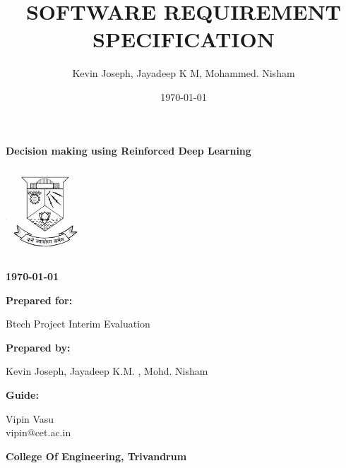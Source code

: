 \documentclass[twoside,letterpaper]{article}
\title{SOFTWARE REQUIREMENT SPECIFICATION}
\author{Kevin Joseph, Jayadeep K M, Mohammed. Nisham}
\date{\today}
\begin{document}


\bigskip

{\centering{}\bfseries\color{black}
Decision making using Reinforced Deep Learning
\par}


\bigskip

\centering
\includegraphics[width=3cm]{images/logo.jpg}

\bigskip

{\centering{}\bfseries\color{black}
\today
\par}


\bigskip


\bigskip

{\centering{}\bfseries\color{black}
Prepared for:
\par}

{\centering{}\color{black}
Btech Project Interim Evaluation
\par}


\bigskip


\bigskip

{\centering{}\bfseries\color{black}
Prepared by:
\par}

{\centering{}\color{black}
Kevin Joseph, Jayadeep K.M. , Mohd. Nisham
\par}
\bigskip
{\centering{}\bfseries\color{black}
Guide:
\par}

{\centering{}\color{black}
Vipin Vasu\\
vipin@cet.ac.in\\
\par}
\bigskip
{\centering{}\bfseries\color{black}
College Of Engineering, Trivandrum
\par}

\end{document}
